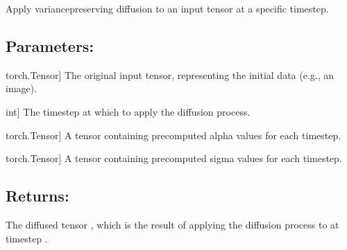 \documentclass[a4paper,10pt,english]{sphinxmanual}
\begin{document}
\begin{fulllineitems}
\label{\detokenize{models:fireDiff.Models.utils.variance_preserving_diffusion}}
\pysigstartsignatures
{}
\pysigstopsignatures
\sphinxAtStartPar
Apply variance\sphinxhyphen{}preserving diffusion to an input tensor at a specific
timestep.


\subsection{Parameters:}
\label{\detokenize{models:id59}}\begin{description}
\sphinxlineitem{x\_0}{[}torch.Tensor{]}
\sphinxAtStartPar
The original input tensor, representing the initial data
(e.g., an image).

\sphinxlineitem{t}{[}int{]}
\sphinxAtStartPar
The timestep at which to apply the diffusion process.

\sphinxlineitem{alpha\_tau}{[}torch.Tensor{]}
\sphinxAtStartPar
A tensor containing precomputed alpha values for each timestep.

\sphinxlineitem{sigma\_tau}{[}torch.Tensor{]}
\sphinxAtStartPar
A tensor containing precomputed sigma values for each timestep.

\end{description}


\subsection{Returns:}
\label{\detokenize{models:id60}}\begin{description}
\sphinxAtStartPar
The diffused tensor , which is the result of applying the
diffusion process to  at timestep .

\end{description}



\end{fulllineitems}
\end{document}
